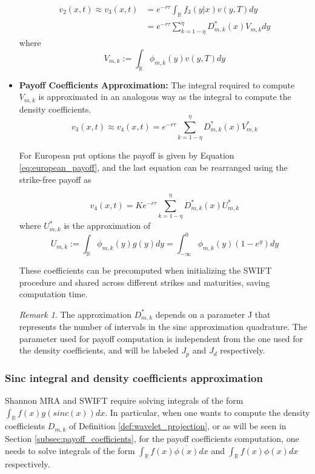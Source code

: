 \documentclass[12,twoside]{mammeTFM}
\theoremstyle{definition}
\theoremstyle{remark}
\newtheorem{remark}[thm]{Remark}
\newcommand{\R}{\ensuremath{\mathbb{R}}}
\begin{document}
\begin{itemize}
\begin{equation}
\end{equation}
\begin{equation}
\begin{aligned}
v_2(x,t) \approx v_3(x,t) & = e^{-r \tau} \int_{\R} f_3(y|x)v(y, T)dy \\
&= e^{-r \tau} \sum_{k = 1 - \eta}^{\eta} D_{m,k}^{*}(x)  V_{m,k}dy
\end{aligned}
\end{equation}
where
\begin{equation}
V_{m,k} := \int_{\R} \phi_{m,k}(y) v(y, T)dy
\end{equation}
\item \textbf{Payoff Coefficients Approximation: }
The integral required to compute $V_{m,k}$ is approximated in an analogous way as the integral to compute the density coefficients.
\begin{equation}
v_3(x,t) \approx v_4(x,t) = e^{-r \tau} \sum_{k = 1 - \eta}^{\eta} D_{m,k}^{*}(x) V_{m,k}^{*}
\end{equation}

For European put options the payoff is given by Equation \ref{eq:european_payoff}, and the last equation can be rearranged using the strike-free payoff as

\begin{equation} \label{step:final}
v_4(x,t) = K e^{-r \tau} \sum_{k = 1 - \eta}^{\eta} D_{m,k}^{*}(x) U_{m,k}^{*}
\end{equation}
where $U_{m,k}^{*}$ is the approximation of 
\begin{equation} \label{eq:compact_payoffs}
U_{m,k} := \int_{\R} \phi_{m,k}(y)g(y) dy = \int_{-\infty}^{0} \phi_{m,k}(y)(1-e^{y}) dy
\end{equation}

These coefficients can be precomputed when initializing the SWIFT procedure and shared across different strikes and maturities, saving computation time.
\begin{remark}
The approximation $D_{m,k}^{*}$ depends on a parameter J that represents the number of intervals in the sinc approximation quadrature. The parameter used for payoff computation is independent from the one used for the density coefficients, and will be labeled $J_p$ and $J_d$ respectively.
\end{remark}
\end{itemize}

\subsubsection{Sinc integral and density coefficients approximation}\label{sec:sinc_integral}
Shannon MRA and SWIFT require solving integrals of the form $\int_{\R} f(x) g(sinc(x)) dx$. In particular, when one wants to compute the density coefficients $D_{m,k}$ of Definition \ref{def:wavelet_projection}, or as will be seen in Section \ref{subsec:payoff_coefficients}, for the payoff coefficients computation, one needs to solve integrals of the form $\int_{\R} f(x) \overline{\phi(x)} dx$ and $\int_{\R} f(x) \phi(x) dx$ respectively.
\end{document}
